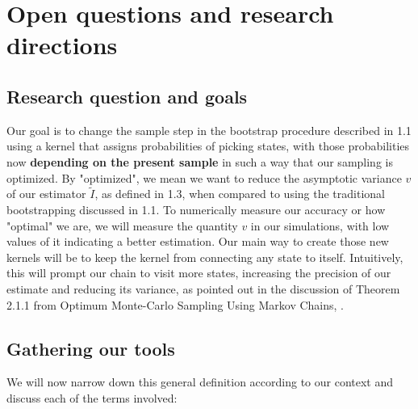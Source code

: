 

\section{Open questions and research directions}

\subsection{Research question and goals}

Our goal is to change the sample step in the bootstrap procedure described in 1.1 using a kernel that assigns probabilities of picking states, with those probabilities now \textbf{depending on the present sample} in such a way that our sampling is optimized. By "optimized", we mean we want to reduce the asymptotic variance \textbf{$v$} of our estimator $\tilde{I}$, as defined in 1.3, when compared to using the traditional bootstrapping discussed in 1.1. To numerically measure our accuracy or how "optimal" we are, we will measure the quantity \textbf{$v$} in our simulations, with low values of it indicating a better estimation. Our main way to create those new kernels will be to keep the kernel from connecting any state to itself. Intuitively, this will prompt our chain to visit more states, increasing the precision of our estimate and reducing its variance, as pointed out in the discussion of Theorem 2.1.1 from Optimum Monte-Carlo Sampling Using Markov Chains, \Peskun.

\subsection{Gathering our tools}
We will now narrow down this general definition according to our context and discuss each of the terms involved:

